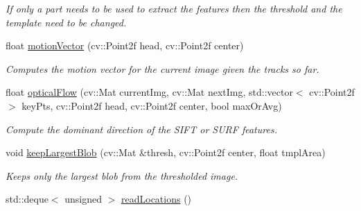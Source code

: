 \begin{DoxyCompactItemize}
\begin{DoxyCompactList}\small\item\em If only a part needs to be used to extract the features then the threshold and the template need to be changed. \item\end{DoxyCompactList}\item 
\hypertarget{classpeopleDetector_a737c4d4b80c656742d10e5d4f8ee54c0}{
float \hyperlink{classpeopleDetector_a737c4d4b80c656742d10e5d4f8ee54c0}{motionVector} (cv::Point2f head, cv::Point2f center)}
\label{classpeopleDetector_a737c4d4b80c656742d10e5d4f8ee54c0}

\begin{DoxyCompactList}\small\item\em Computes the motion vector for the current image given the tracks so far. \item\end{DoxyCompactList}\item 
\hypertarget{classpeopleDetector_ab6aecdfb5e067be5d756628cde087ac4}{
float \hyperlink{classpeopleDetector_ab6aecdfb5e067be5d756628cde087ac4}{opticalFlow} (cv::Mat currentImg, cv::Mat nextImg, std::vector$<$ cv::Point2f $>$ keyPts, cv::Point2f head, cv::Point2f center, bool maxOrAvg)}
\label{classpeopleDetector_ab6aecdfb5e067be5d756628cde087ac4}

\begin{DoxyCompactList}\small\item\em Compute the dominant direction of the SIFT or SURF features. \item\end{DoxyCompactList}\item 
\hypertarget{classpeopleDetector_adb7eb17dacd00e645a29cee8e06191af}{
void \hyperlink{classpeopleDetector_adb7eb17dacd00e645a29cee8e06191af}{keepLargestBlob} (cv::Mat \&thresh, cv::Point2f center, float tmplArea)}
\label{classpeopleDetector_adb7eb17dacd00e645a29cee8e06191af}

\begin{DoxyCompactList}\small\item\em Keeps only the largest blob from the thresholded image. \item\end{DoxyCompactList}\item 
\hypertarget{classpeopleDetector_af5fae407020a2e7bb2d7a39dd0f4fd94}{
std::deque$<$ unsigned $>$ \hyperlink{classpeopleDetector_af5fae407020a2e7bb2d7a39dd0f4fd94}{readLocations} ()}
\label{classpeopleDetector_af5fae407020a2e7bb2d7a39dd0f4fd94}


\end{DoxyCompactItemize}
